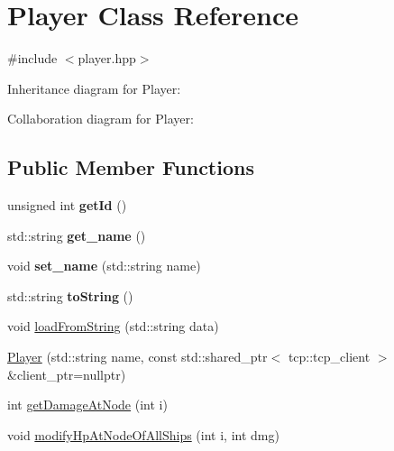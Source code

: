 \hypertarget{classPlayer}{}\section{Player Class Reference}
\label{classPlayer}


{\ttfamily \#include $<$player.\+hpp$>$}



Inheritance diagram for Player\+:


Collaboration diagram for Player\+:
\subsection*{Public Member Functions}
\begin{DoxyCompactItemize}
\item 
unsigned int {\bfseries get\+Id} ()\hypertarget{classPlayer_aefc3db8fc54fab638b25764a4c37f078}{}\label{classPlayer_aefc3db8fc54fab638b25764a4c37f078}

\item 
std\+::string {\bfseries get\+\_\+name} ()\hypertarget{classPlayer_a788340fc5f21143f47eed04f6fd79976}{}\label{classPlayer_a788340fc5f21143f47eed04f6fd79976}

\item 
void {\bfseries set\+\_\+name} (std\+::string name)\hypertarget{classPlayer_a318d379b56621caf571b97b54965b2e9}{}\label{classPlayer_a318d379b56621caf571b97b54965b2e9}

\item 
std\+::string {\bfseries to\+String} ()\hypertarget{classPlayer_a717f15939def0ddbbe3ca6c1aa82a810}{}\label{classPlayer_a717f15939def0ddbbe3ca6c1aa82a810}

\item 
void \hyperlink{classPlayer_acbcf66d4a9b70d3dcca3ed26c38a8490}{load\+From\+String} (std\+::string data)
\item 
\hyperlink{classPlayer_a11226c6f07703e035c6a774ac96fce09}{Player} (std\+::string name, const std\+::shared\+\_\+ptr$<$ tcp\+::tcp\+\_\+client $>$ \&client\+\_\+ptr=nullptr)
\item 
int \hyperlink{classPlayer_af68c963cdf0b35d8d7b9c606e1e77e35}{get\+Damage\+At\+Node} (int i)
\item 
void \hyperlink{classPlayer_a3a5f609e38da1966741fd5c79d14ca20}{modify\+Hp\+At\+Node\+Of\+All\+Ships} (int i, int dmg)
\end{DoxyCompactItemize}

